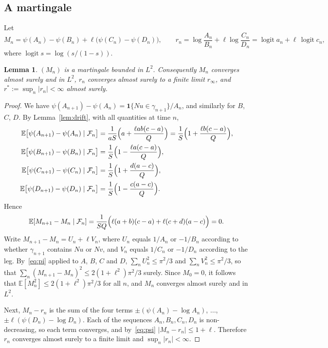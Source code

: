 \documentclass[11pt]{amsart}
\newtheorem{lemma}[theorem]{Lemma}
\theoremstyle{remark}
\newcommand{\EE}{\mathbb{E}}
\newcommand{\cF}{\mathcal{F}}
\newcommand{\one}{\mathbf{1}}
\newcommand{\logit}{\operatorname{logit}}
\begin{document}
\subsection{A martingale}\label{sec:mart}
Let
\[
M_n=\psi(A_n)-\psi(B_n)+\ell\bigl(\psi(C_n)-\psi(D_n)\bigr),\qquad
r_n=\log\frac{A_n}{B_n}+\ell\log\frac{C_n}{D_n}=\logit a_n+\ell\,\logit c_n,
\]
where $\logit s=\log(s/(1-s))$.

\begin{lemma}\label{lem:mart}
$(M_n)$ is a martingale bounded in $L^2$. Consequently $M_n$ converges almost surely and in $L^2$, $r_n$ converges
almost surely to a finite limit $r_\infty$, and $r^*:=\sup_n|r_n|<\infty$ almost surely.
\end{lemma}
\begin{proof}
We have $\psi(A_{n+1})-\psi(A_n)=\one\{Nu\in\gamma_{n+1}\}/A_n$, and similarly for $B$, $C$, $D$. By
Lemma~\ref{lem:drift}, with all quantities at time $n$,
\begin{align*}
\EE\bigl[\psi(A_{n+1})-\psi(A_n)\mid\cF_n\bigr]&=\frac{1}{aS}\Bigl(a+\frac{\ell ab(c-a)}{Q}\Bigr)
=\frac1S\Bigl(1+\frac{\ell b(c-a)}{Q}\Bigr),\\
\EE\bigl[\psi(B_{n+1})-\psi(B_n)\mid\cF_n\bigr]&=\frac1S\Bigl(1-\frac{\ell a(c-a)}{Q}\Bigr),\\
\EE\bigl[\psi(C_{n+1})-\psi(C_n)\mid\cF_n\bigr]&=\frac1S\Bigl(1+\frac{d(a-c)}{Q}\Bigr),\\
\EE\bigl[\psi(D_{n+1})-\psi(D_n)\mid\cF_n\bigr]&=\frac1S\Bigl(1-\frac{c(a-c)}{Q}\Bigr).
\end{align*}
Hence
\[
\EE[M_{n+1}-M_n\mid\cF_n]=\frac{1}{SQ}\Bigl(\ell(a+b)(c-a)+\ell(c+d)(a-c)\Bigr)=0 .
\]
Write $M_{n+1}-M_n=U_n+\ell V_n$, where $U_n$ equals $1/A_n$ or $-1/B_n$ according to whether $\gamma_{n+1}$ contains
$Nu$ or $Nv$, and $V_n$ equals $1/C_n$ or $-1/D_n$ according to the leg. By~\eqref{eq:pi} applied to $A$, $B$, $C$ and
$D$, $\sum_nU_n^2\le\pi^2/3$ and $\sum_nV_n^2\le\pi^2/3$, so that $\sum_n(M_{n+1}-M_n)^2\le2(1+\ell^2)\pi^2/3$ surely.
Since $M_0=0$, it follows that $\EE[M_n^2]\le2(1+\ell^2)\pi^2/3$ for all $n$, and $M_n$ converges almost surely and in
$L^2$.

Next, $M_n-r_n$ is the sum of the four terms $\pm(\psi(A_n)-\log A_n)$, $\dots$, $\pm\ell(\psi(D_n)-\log D_n)$. Each
of the sequences $A_n,B_n,C_n,D_n$ is non-decreasing, so each term converges, and by~\eqref{eq:psi}
$|M_n-r_n|\le1+\ell$. Therefore $r_n$ converges almost surely to a finite limit and $\sup_n|r_n|<\infty$.
\end{proof}
\end{document}
